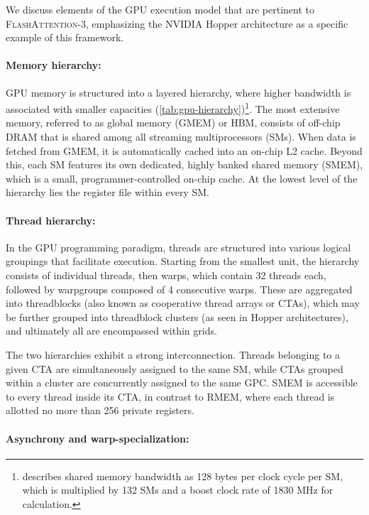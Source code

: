 We discuss elements of the GPU execution model that are pertinent to \textsc{FlashAttention-3}, emphasizing the NVIDIA Hopper architecture as a specific example of this framework.

\paragraph{Memory hierarchy:} GPU memory is structured into a layered hierarchy, where higher bandwidth is associated with smaller capacities (\cref{tab:gpu-hierarchy})\footnote{\citet{luo2024benchmarking} describes shared memory bandwidth as 128 bytes per clock cycle per SM, which is multiplied by 132 SMs and a boost clock rate of 1830 MHz for calculation.}. The most extensive memory, referred to as global memory (GMEM) or HBM, consists of off-chip DRAM that is shared among all streaming multiprocessors (SMs). When data is fetched from GMEM, it is automatically cached into an on-chip L2 cache. Beyond this, each SM features its own dedicated, highly banked shared memory (SMEM), which is a small, programmer-controlled on-chip cache. At the lowest level of the hierarchy lies the register file within every SM.

\paragraph{Thread hierarchy:} In the GPU programming paradigm, threads are structured into various logical groupings that facilitate execution. Starting from the smallest unit, the hierarchy consists of individual threads, then warps, which contain 32 threads each, followed by warpgroups composed of 4 consecutive warps. These are aggregated into threadblocks (also known as cooperative thread arrays or CTAs), which may be further grouped into threadblock clusters (as seen in Hopper architectures), and ultimately all are encompassed within grids.

The two hierarchies exhibit a strong interconnection. Threads belonging to a given CTA are simultaneously assigned to the same SM, while CTAs grouped within a cluster are concurrently assigned to the same GPC. SMEM is accessible to every thread inside its CTA, in contrast to RMEM, where each thread is allotted no more than 256 private registers.

\paragraph{Asynchrony and warp-specialization:}

